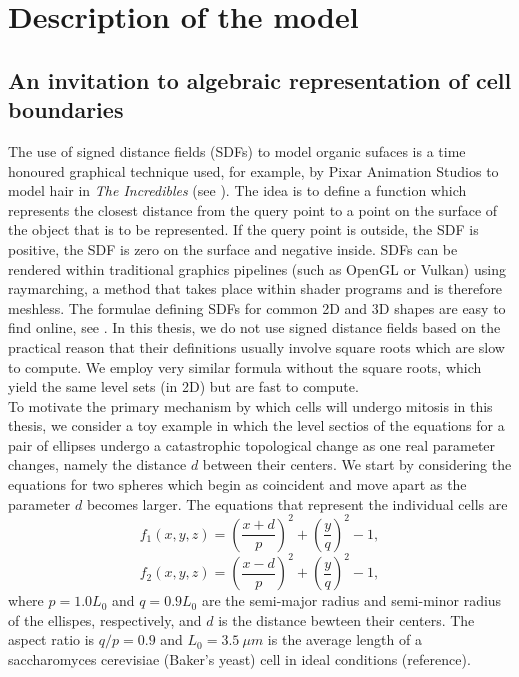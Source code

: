 \chapter{ Description of the model \label{ch:numero_uno}}
\section{An invitation to algebraic representation of cell boundaries}
The use of signed distance fields (SDFs) to model organic sufaces
is a time honoured graphical technique used, for example, by Pixar
Animation Studios to model hair in \textit{The Incredibles} 
(see \cite{petrovic2005volumetric}). The idea is to define a 
function which represents the closest distance from the query point
to a point on the surface of the object that is to be represented. 
If the query point is outside, the SDF is positive,
the SDF is zero on the surface and negative inside. SDFs can be 
rendered within traditional graphics pipelines (such as OpenGL or Vulkan)
using raymarching, a method that takes place within shader programs and 
is therefore meshless. The formulae defining SDFs for common 2D and 3D 
shapes are easy to find online, see \cite{key}. In this thesis,
we do not use signed distance fields based on the practical 
reason that their definitions usually involve square roots
which are slow to compute. We employ very similar formula
without the square roots, which yield the same level sets (in 2D)
but are fast to compute.
\\

To motivate the primary mechanism by which cells will undergo mitosis 
in this thesis, we consider a toy example in which the level sectios of the equations for
a pair of ellipses undergo a catastrophic topological change as one real parameter 
changes, namely the distance $d$ between their centers. We start by considering 
the equations for two spheres which 
begin as coincident and move apart as the parameter $d$ becomes larger. 
The equations that represent the individual cells are
\begin{equation*}
    f_1(x,y,z) = \left( \frac{x+d}{p} \right)^2 + \left( \frac{y}{q} \right)^2 - 1,
\end{equation*}
\begin{equation*}
    f_2(x,y,z) = \left( \frac{x-d}{p} \right)^2 + \left( \frac{y}{q} \right)^2 - 1,
\end{equation*}
where $p=1.0 L_0$ and $q=0.9 L_0$ are the semi-major radius and semi-minor radius
of the ellispes, respectively, 
and $d$ is the distance bewteen their centers. The aspect ratio is $q/p = 0.9$ and $L_0 = 3.5 \ \mu m$
is the average length of a  saccharomyces cerevisiae (Baker's yeast) cell in ideal conditions (reference).
\\

